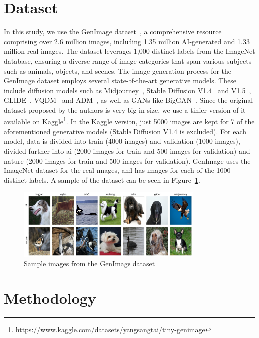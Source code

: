 \documentclass[runningheads]{llncs}
\begin{document}
%
%
\section{Dataset}

In this study, we use the GenImage dataset~\cite{zhu2023genimage}, a comprehensive resource comprising over 2.6 million images, including 1.35 million AI-generated and 1.33 million real images. The dataset leverages 1,000 distinct labels from the ImageNet database, ensuring a diverse range of image categories that span various subjects such as animals, objects, and scenes. The image generation process for the GenImage dataset employs several state-of-the-art generative models. These include diffusion models such as Midjourney~\cite{midjourney}, Stable Diffusion V1.4~\cite{robin2022sd} and V1.5~\cite{robin2022sd}, GLIDE~\cite{nichol2022glide}, VQDM~\cite{shuyang2022vqdm} and ADM~\cite{dhariwal2021adm}, as well as GANs like BigGAN~\cite{brock2019largescalegantraining}. Since the original dataset proposed by the authors is very big in size, we use a tinier version of it available on Kaggle\footnote{https://www.kaggle.com/datasets/yangsangtai/tiny-genimage}. In the Kaggle version, just 5000 images are kept for 7 of the aforementioned generative models (Stable Diffusion V1.4 is excluded). For each model, data is divided into train (4000 images) and validation (1000 images), divided further into ai (2000 images for train and 500 images for validation) and nature (2000 images for train and 500 images for validation). GenImage uses the ImageNet dataset for the real images, and has images for each of the 1000 distinct labels. A sample of the dataset can be seen in Figure~\ref{fig:dataset-sample}.

\begin{figure}[ht]
    \centering
    \includegraphics[width=0.8\textwidth]{graphics/dataset_sample.jpeg}
    \caption{Sample images from the GenImage dataset}
    \label{fig:dataset-sample}
\end{figure}

%
%
\section{Methodology}
\end{document}
